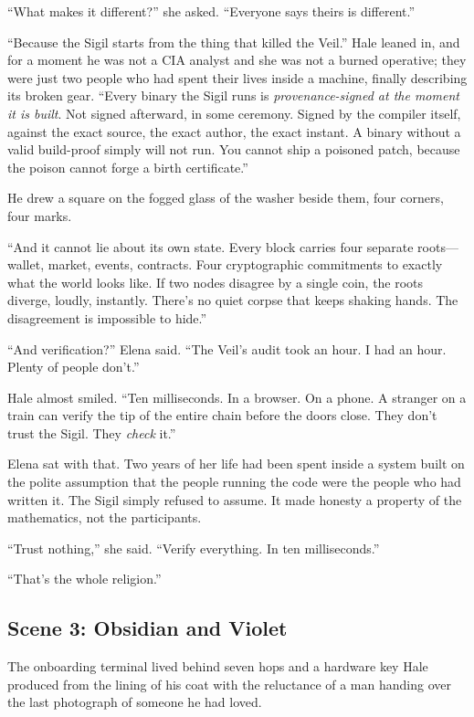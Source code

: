 ``What makes it different?'' she asked. ``Everyone says theirs is different.''

``Because the Sigil starts from the thing that killed the Veil.'' Hale leaned in, and for a moment he was not a CIA analyst and she was not a burned operative; they were just two people who had spent their lives inside a machine, finally describing its broken gear. ``Every binary the Sigil runs is \emph{provenance-signed at the moment it is built}. Not signed afterward, in some ceremony. Signed by the compiler itself, against the exact source, the exact author, the exact instant. A binary without a valid build-proof simply will not run. You cannot ship a poisoned patch, because the poison cannot forge a birth certificate.''

He drew a square on the fogged glass of the washer beside them, four corners, four marks.

``And it cannot lie about its own state. Every block carries four separate roots---wallet, market, events, contracts. Four cryptographic commitments to exactly what the world looks like. If two nodes disagree by a single coin, the roots diverge, loudly, instantly. There's no quiet corpse that keeps shaking hands. The disagreement is impossible to hide.''

``And verification?'' Elena said. ``The Veil's audit took an hour. I had an hour. Plenty of people don't.''

Hale almost smiled. ``Ten milliseconds. In a browser. On a phone. A stranger on a train can verify the tip of the entire chain before the doors close. They don't trust the Sigil. They \emph{check} it.''

Elena sat with that. Two years of her life had been spent inside a system built on the polite assumption that the people running the code were the people who had written it. The Sigil simply refused to assume. It made honesty a property of the mathematics, not the participants.

``Trust nothing,'' she said. ``Verify everything. In ten milliseconds.''

``That's the whole religion.''

\hypertarget{scene-3-obsidian-and-violet}{%
\subsection{Scene 3: Obsidian and Violet}\label{scene-3-obsidian-and-violet}}

The onboarding terminal lived behind seven hops and a hardware key Hale produced from the lining of his coat with the reluctance of a man handing over the last photograph of someone he had loved.

